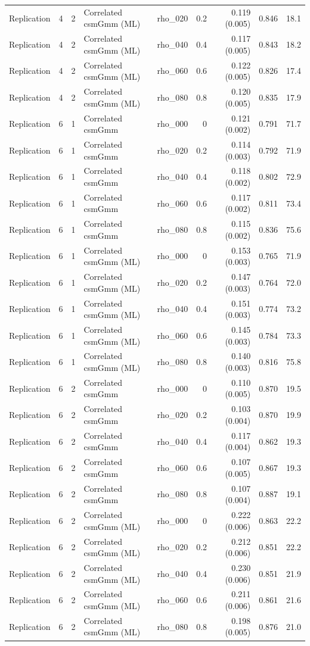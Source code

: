 \begin{longtable}{lcclrrrrr}
Replication & 4 & 2 & Correlated csmGmm (ML) & rho\_020 & 0.2 & 0.119 (0.005) & 0.846 & 18.1\\
Replication & 4 & 2 & Correlated csmGmm (ML) & rho\_040 & 0.4 & 0.117 (0.005) & 0.843 & 18.2\\
Replication & 4 & 2 & Correlated csmGmm (ML) & rho\_060 & 0.6 & 0.122 (0.005) & 0.826 & 17.4\\
Replication & 4 & 2 & Correlated csmGmm (ML) & rho\_080 & 0.8 & 0.120 (0.005) & 0.835 & 17.9\\
Replication & 6 & 1 & Correlated csmGmm & rho\_000 & 0 & 0.121 (0.002) & 0.791 & 71.7\\
Replication & 6 & 1 & Correlated csmGmm & rho\_020 & 0.2 & 0.114 (0.003) & 0.792 & 71.9\\
Replication & 6 & 1 & Correlated csmGmm & rho\_040 & 0.4 & 0.118 (0.002) & 0.802 & 72.9\\
Replication & 6 & 1 & Correlated csmGmm & rho\_060 & 0.6 & 0.117 (0.002) & 0.811 & 73.4\\
Replication & 6 & 1 & Correlated csmGmm & rho\_080 & 0.8 & 0.115 (0.002) & 0.836 & 75.6\\
Replication & 6 & 1 & Correlated csmGmm (ML) & rho\_000 & 0 & 0.153 (0.003) & 0.765 & 71.9\\
Replication & 6 & 1 & Correlated csmGmm (ML) & rho\_020 & 0.2 & 0.147 (0.003) & 0.764 & 72.0\\
Replication & 6 & 1 & Correlated csmGmm (ML) & rho\_040 & 0.4 & 0.151 (0.003) & 0.774 & 73.2\\
Replication & 6 & 1 & Correlated csmGmm (ML) & rho\_060 & 0.6 & 0.145 (0.003) & 0.784 & 73.3\\
Replication & 6 & 1 & Correlated csmGmm (ML) & rho\_080 & 0.8 & 0.140 (0.003) & 0.816 & 75.8\\
Replication & 6 & 2 & Correlated csmGmm & rho\_000 & 0 & 0.110 (0.005) & 0.870 & 19.5\\
Replication & 6 & 2 & Correlated csmGmm & rho\_020 & 0.2 & 0.103 (0.004) & 0.870 & 19.9\\
Replication & 6 & 2 & Correlated csmGmm & rho\_040 & 0.4 & 0.117 (0.004) & 0.862 & 19.3\\
Replication & 6 & 2 & Correlated csmGmm & rho\_060 & 0.6 & 0.107 (0.005) & 0.867 & 19.3\\
Replication & 6 & 2 & Correlated csmGmm & rho\_080 & 0.8 & 0.107 (0.004) & 0.887 & 19.1\\
Replication & 6 & 2 & Correlated csmGmm (ML) & rho\_000 & 0 & 0.222 (0.006) & 0.863 & 22.2\\
Replication & 6 & 2 & Correlated csmGmm (ML) & rho\_020 & 0.2 & 0.212 (0.006) & 0.851 & 22.2\\
Replication & 6 & 2 & Correlated csmGmm (ML) & rho\_040 & 0.4 & 0.230 (0.006) & 0.851 & 21.9\\
Replication & 6 & 2 & Correlated csmGmm (ML) & rho\_060 & 0.6 & 0.211 (0.006) & 0.861 & 21.6\\
Replication & 6 & 2 & Correlated csmGmm (ML) & rho\_080 & 0.8 & 0.198 (0.005) & 0.876 & 21.0\\
\bottomrule
\end{longtable}
